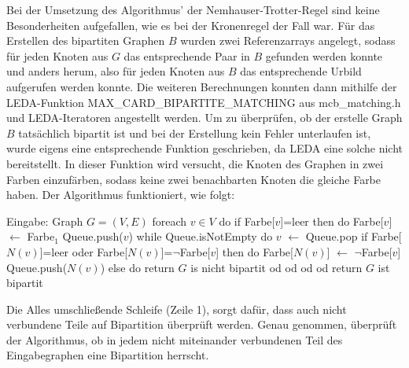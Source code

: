 Bei der Umsetzung des Algorithmus' der Nemhauser-Trotter-Regel sind keine Besonderheiten aufgefallen, wie es bei der Kronenregel der Fall war. Für das Erstellen des bipartiten Graphen $B$ wurden zwei Referenzarrays angelegt, sodass für jeden Knoten aus $G$ das entsprechende Paar in $B$ gefunden werden konnte und anders herum, also für jeden Knoten aus $B$ das entsprechende Urbild aufgerufen werden konnte. Die weiteren Berechnungen konnten dann mithilfe der LEDA-Funktion MAX\_CARD\_BIPARTITE\_MATCHING aus mcb\_matching.h und LEDA-Iteratoren angestellt werden. Um zu überprüfen, ob der erstelle Graph $B$ tatsächlich bipartit ist und bei der Erstellung kein Fehler unterlaufen ist, wurde eigens eine entsprechende Funktion geschrieben, da LEDA eine solche nicht bereitstellt. In dieser Funktion wird versucht, die Knoten des Graphen in zwei Farben einzufärben, sodass keine zwei benachbarten Knoten die gleiche Farbe haben. Der Algorithmus funktioniert, wie folgt:
\begin{singlespace}
\begin{algorithm}[caption={Bipartit-Check}, label={alg4}]
Eingabe: Graph $G=(V,E)$ 
foreach $ v \in V$ do
  if Farbe[$v$]=leer then do
    Farbe[$v$] $\leftarrow$ Farbe$_{1}$    
    Queue.push($v$)
    while Queue.isNotEmpty do
      $v$ $\leftarrow$ Queue.pop
      if Farbe[$N(v)$]=leer oder Farbe[$N(v)$]=$\neg$Farbe[$v$] then do
        Farbe[$N(v)$] $\leftarrow$ $\neg$Farbe[$v$]
        Queue.push($N(v)$)
      else do
        return $G$ is nicht bipartit
      od 
    od
  od  
od
return $G$ ist bipartit
\end{algorithm}
\end{singlespace}
Die Alles umschließende Schleife (Zeile 1), sorgt dafür, dass auch nicht verbundene Teile auf Bipartition überprüft werden. Genau genommen, überprüft der Algorithmus, ob in jedem nicht miteinander verbundenen Teil des Eingabegraphen eine Bipartition herrscht.





